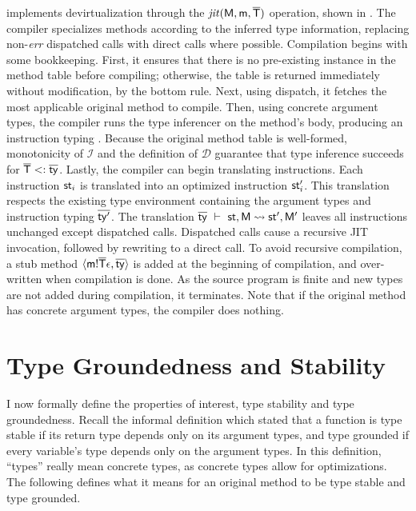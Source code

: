 \jules implements devirtualization through the $\operatorname{\mathit{jit}}(\mathsf{M},\mathsf{m},\overline{\mathsf{T}})$
operation, shown in . The compiler specializes methods according to the
inferred type information, replacing non-\emph{err} dispatched calls with direct calls where
possible. Compilation begins with some bookkeeping. First, it ensures that there
is no pre-existing instance in the method table before compiling;
otherwise, the table is returned immediately without modification, by
the bottom rule. Next, using dispatch,
it fetches the most applicable original method to compile. Then, using concrete argument types,
the compiler runs the type inferencer on the method's body, producing an
instruction typing . Because the original method table is well-formed,
monotonicity of $\mathcal I$ and the definition of $\mathcal D$ guarantee that
type inference succeeds for $\overline{\mathsf{T}} <: \overline{\mathsf{ty}}$. Lastly, the compiler can begin
translating instructions. Each instruction $\mathsf{st}_i$ is translated into an
optimized instruction $\mathsf{st}'_i$. This translation respects the existing type
environment containing the argument types \ol\Ty and instruction typing
$\overline{\mathsf{ty}'}$. The translation $ \overline{\mathsf{ty}}\ \vdash\ \mathsf{st},\mathsf{M} \leadsto \mathsf{st}',\mathsf{M}'$
leaves all instructions unchanged except dispatched calls. Dispatched calls
cause a recursive JIT invocation, followed by rewriting to a direct call. To
avoid recursive compilation, a stub method $\langle \mathsf{m}!{\overline{\mathsf{T}}}\epsilon,
\overline{\mathsf{ty}} \rangle$ is added at the beginning of compilation,
and over-written when compilation is done. As the source program is finite and
new types are not added during compilation, it terminates. Note that if
the original method has concrete argument types, the compiler does nothing.


\section{Type Groundedness and Stability}\label{sec:stability-formal}

I now formally define the properties of interest, type stability and type
groundedness. Recall the informal definition which stated that a function is
type stable if its return type depends only on its argument types, and type grounded
if every variable's type depends only on the argument types. In this
definition, ``types'' really mean concrete types, as concrete types allow for
optimizations. The following defines what it means for an original method to be
type stable and type grounded.

